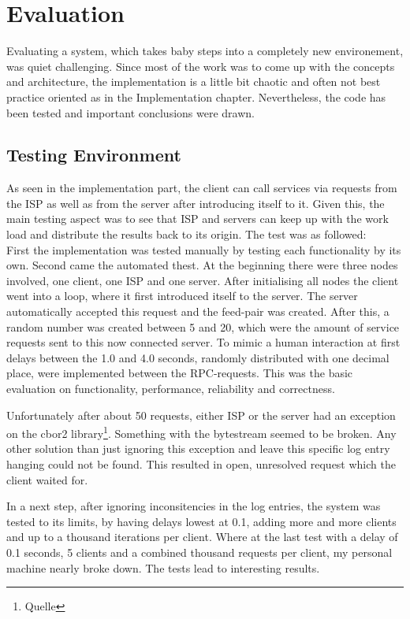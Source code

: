\chapter{Evaluation}
Evaluating a system, which takes baby steps into a completely new environement, was quiet challenging. Since most of the work was to come up with the concepts and architecture, the implementation is a little bit chaotic and often not best practice oriented as in the Implementation chapter. Nevertheless, the code has been tested and important conclusions were drawn.
\section{Testing Environment}
As seen in the implementation part, the client can call services via requests from the ISP as well as from the server after introducing itself to it. Given this, the main testing aspect was to see that ISP and servers can keep up with the work load and distribute the results back to its origin. The test was as followed:\\
First the implementation was tested manually by testing each functionality by its own. Second came the automated thest. At the beginning there were three nodes involved, one client, one ISP and one server. After initialising all nodes the client went into a loop, where it first introduced itself to the server. The server automatically accepted this request and the feed-pair was created. After this, a random number was created between 5 and 20, which were the amount of service requests sent to this now connected server. To mimic a human interaction at first delays between the 1.0 and 4.0 seconds, randomly distributed with one decimal place, were implemented between the RPC-requests. This was the basic evaluation on functionality, performance, reliability and correctness.

Unfortunately after about 50 requests, either ISP or the server had an exception on the cbor2 library\footnote{Quelle}. Something with the bytestream seemed to be broken. Any other solution than just ignoring this exception and leave this specific log entry hanging could not be found. This resulted in open, unresolved request which the client waited for.

In a next step, after ignoring inconsitencies in the log entries, the system was tested to its limits, by having delays lowest at 0.1, adding more and more clients and up to a thousand iterations per client. Where at the last test with a delay of 0.1 seconds, 5 clients and a combined thousand requests per client, my personal machine nearly broke down. The tests lead to interesting results.


